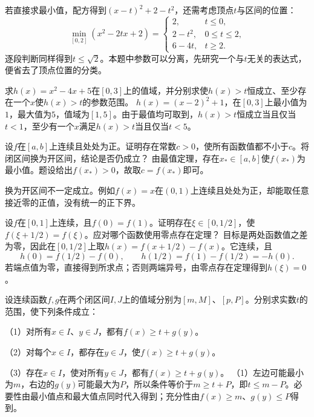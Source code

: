 若直接求最小值，配方得到\((x-t)^2+2-t^2\)，还需考虑顶点\(t\)与区间的位置：
\[
\min_{[0,2]}(x^2-2tx+2)=
\begin{cases}2,&t\le0,\\2-t^2,&0\le t\le2,\\6-4t,&t\ge2.\end{cases}
\]
逐段判断同样得到\(t\le\sqrt2\)。本题中参数可以分离，先研究一个与\(t\)无关的表达式，便省去了顶点位置的分类。


求\(h(x)=x^2-4x+5\)在\([0,3]\)上的值域，并分别求使\(h(x)>t\)恒成立、至少存在一个\(x\)使\(h(x)>t\)的参数范围。
\solutionanswer
\(h(x)=(x-2)^2+1\)，在\([0,3]\)上最小值为\(1\)，最大值为\(5\)，值域为\([1,5]\)。由于最值均可取到，\(h(x)>t\)恒成立当且仅当\(t<1\)，至少有一个\(x\)满足\(h(x)>t\)当且仅当\(t<5\)。


设\(f\)在\([a,b]\)上连续且处处为正。证明存在常数\(c>0\)，使所有函数值都不小于\(c\)。将闭区间换为开区间，结论是否仍成立？
\solutionanswer
由最值定理，存在\(x_*\in[a,b]\)使\(f(x_*)\)为最小值。题设给出\(f(x_*)>0\)，故取\(c=f(x_*)\)即可。

换为开区间不一定成立。例如\(f(x)=x\)在\((0,1)\)上连续且处处为正，却能取任意接近零的正值，没有统一的正下界。


设\(f\)在\([0,1]\)上连续，且\(f(0)=f(1)\)。证明存在\(\xi\in[0,1/2]\)，使\(f(\xi+1/2)=f(\xi)\)。应对哪个函数使用零点存在定理？
\solutionanswer
目标是两处函数值之差为零，因此在\([0,1/2]\)上取\(h(x)=f(x+1/2)-f(x)\)。它连续，且
\[
h(0)=f(1/2)-f(0),\qquad h(1/2)=f(1)-f(1/2)=-h(0).
\]
若端点值为零，直接得到所求点；否则两端异号，由零点存在定理得到\(h(\xi)=0\)。


设连续函数\(f,g\)在两个闭区间\(I,J\)上的值域分别为\([m,M]\)、\([p,P]\)。分别求实数\(t\)的范围，使下列条件成立：

（1）对所有\(x\in I\)、\(y\in J\)，都有\(f(x)\ge t+g(y)\)。

（2）对每个\(x\in I\)，都存在\(y\in J\)，使\(f(x)\ge t+g(y)\)。

（3）存在\(x\in I\)，使对所有\(y\in J\)，都有\(f(x)\ge t+g(y)\)。
\solutionanswer
（1）左边可能最小为\(m\)，右边的\(g(y)\)可能最大为\(P\)，所以条件等价于\(m\ge t+P\)，即\(t\le m-P\)。必要性由最小值点和最大值点同时代入得到；充分性由\(f(x)\ge m\)、\(g(y)\le P\)得到。

